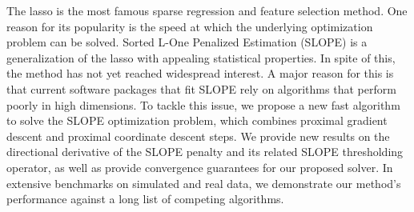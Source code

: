 The lasso is the most famous sparse regression and feature selection method.
One reason for its popularity is the speed at which the underlying optimization problem can be solved.
Sorted L-One Penalized Estimation (SLOPE) is a generalization of the lasso with appealing statistical properties.
In spite of this, the method has not yet reached widespread interest.
A major reason for this is that current software packages that fit SLOPE rely on algorithms that perform poorly in high dimensions. 
To tackle this issue, we propose a new fast algorithm to solve the SLOPE optimization problem,
which combines proximal gradient descent and proximal coordinate descent steps.
We provide new results on the directional derivative of the SLOPE penalty and its related SLOPE thresholding operator, as well as provide convergence guarantees for our proposed solver.
In extensive benchmarks on simulated and real data, we demonstrate our method's performance against a long list of competing algorithms.
